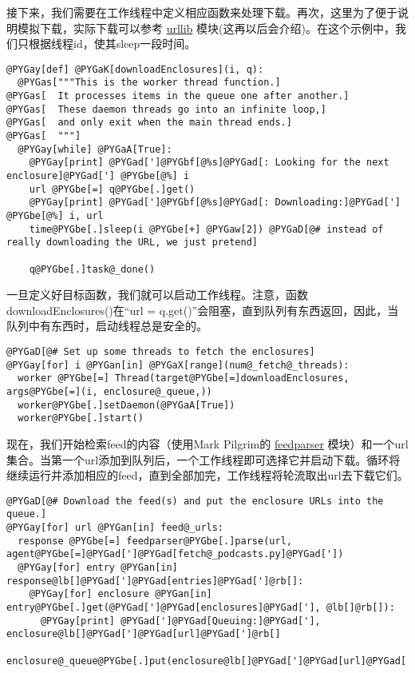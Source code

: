 \documentclass[a4paper,10pt,english]{manual}
\begin{document}
接下来，我们需要在工作线程中定义相应函数来处理下载。再次，这里为了便于说明模拟下载，实际下载可以参考 \href{http://docs.python.org/lib/module-urllib.html}{urllib} 模块(这再以后会介绍)。在这个示例中，我们只根据线程id，使其sleep一段时间。

\begin{Verbatim}[commandchars=@\[\]]
@PYGay[def] @PYGaK[downloadEnclosures](i, q):
  @PYGas["""This is the worker thread function.]
@PYGas[  It processes items in the queue one after another.]
@PYGas[  These daemon threads go into an infinite loop,]
@PYGas[  and only exit when the main thread ends.]
@PYGas[  """]
  @PYGay[while] @PYGaA[True]:
    @PYGay[print] @PYGad[']@PYGbf[@%s]@PYGad[: Looking for the next enclosure]@PYGad['] @PYGbe[@%] i
    url @PYGbe[=] q@PYGbe[.]get()
    @PYGay[print] @PYGad[']@PYGbf[@%s]@PYGad[: Downloading:]@PYGad['] @PYGbe[@%] i, url
    time@PYGbe[.]sleep(i @PYGbe[+] @PYGaw[2]) @PYGaD[@# instead of really downloading the URL, we just pretend]

    q@PYGbe[.]task@_done()
\end{Verbatim}

一旦定义好目标函数，我们就可以启动工作线程。注意，函数downloadEnclosures()在“url = q.get()”会阻塞，直到队列有东西返回，因此，当队列中有东西时，启动线程总是安全的。

\begin{Verbatim}[commandchars=@\[\]]
@PYGaD[@# Set up some threads to fetch the enclosures]
@PYGay[for] i @PYGan[in] @PYGaX[range](num@_fetch@_threads):
  worker @PYGbe[=] Thread(target@PYGbe[=]downloadEnclosures, args@PYGbe[=](i, enclosure@_queue,))
  worker@PYGbe[.]setDaemon(@PYGaA[True])
  worker@PYGbe[.]start()
\end{Verbatim}

现在，我们开始检索feed的内容（使用Mark Pilgrim的 \href{http://www.feedparser.org/}{feedparser} 模块）和一个url集合。当第一个url添加到队列后，一个工作线程即可选择它并启动下载。循环将继续运行并添加相应的feed，直到全部加完，工作线程将轮流取出url去下载它们。

\begin{Verbatim}[commandchars=@\[\]]
@PYGaD[@# Download the feed(s) and put the enclosure URLs into the queue.]
@PYGay[for] url @PYGan[in] feed@_urls:
  response @PYGbe[=] feedparser@PYGbe[.]parse(url, agent@PYGbe[=]@PYGad[']@PYGad[fetch@_podcasts.py]@PYGad['])
  @PYGay[for] entry @PYGan[in] response@lb[]@PYGad[']@PYGad[entries]@PYGad[']@rb[]:
    @PYGay[for] enclosure @PYGan[in] entry@PYGbe[.]get(@PYGad[']@PYGad[enclosures]@PYGad['], @lb[]@rb[]):
      @PYGay[print] @PYGad[']@PYGad[Queuing:]@PYGad['], enclosure@lb[]@PYGad[']@PYGad[url]@PYGad[']@rb[]
      enclosure@_queue@PYGbe[.]put(enclosure@lb[]@PYGad[']@PYGad[url]@PYGad[']@rb[])
\end{Verbatim}
\end{document}
